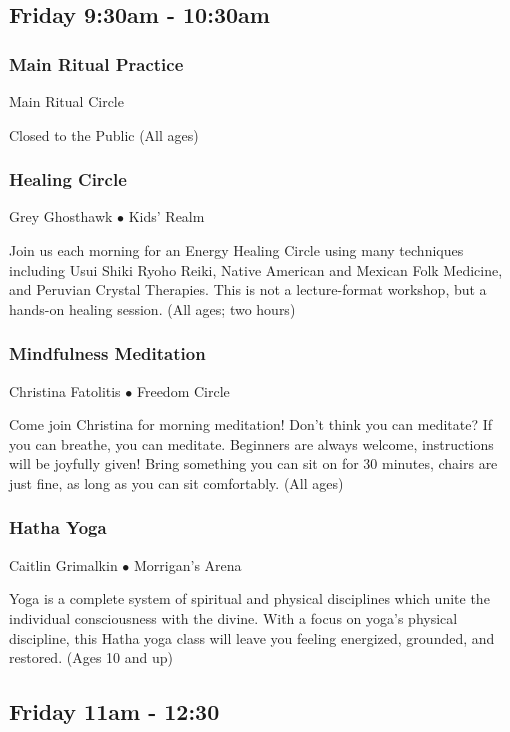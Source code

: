 

\subsection{Friday 9:30am - 10:30am}

\subsubsection{Main Ritual Practice}
\label{Fri-Prac2}
{\small  Main Ritual Circle}

 Closed to the Public {\small (All ages)}

\subsubsection{Healing Circle}
\label{Fri-Healing2}
{\small Grey Ghosthawk $\bullet$  Kids' Realm}

 Join us each morning for an Energy Healing Circle using many techniques including Usui Shiki Ryoho Reiki, Native American and Mexican Folk Medicine, and Peruvian Crystal Therapies. This is not a lecture-format workshop, but a hands-on healing session.  {\small (All ages; two hours)}

\subsubsection{Mindfulness Meditation}
\label{Fri-Fatolitis2}
{\small Christina Fatolitis $\bullet$  Freedom Circle}

 Come join Christina for morning meditation! Don't think you can meditate? If you can breathe, you can meditate. Beginners are always welcome, instructions will be joyfully given! Bring something you can sit on for 30 minutes, chairs are just fine, as long as you can sit comfortably. {\small (All ages)}

\subsubsection{Hatha Yoga}
\label{Fri-Caitlin1}
{\small Caitlin Grimalkin $\bullet$  Morrigan's Arena}

 Yoga is a complete system of spiritual and physical disciplines which unite the individual consciousness with the divine.
With a focus on yoga's physical discipline, this Hatha yoga class will leave you feeling energized, grounded, and restored. {\small (Ages 10 and up)}

\subsection{Friday 11am - 12:30}

